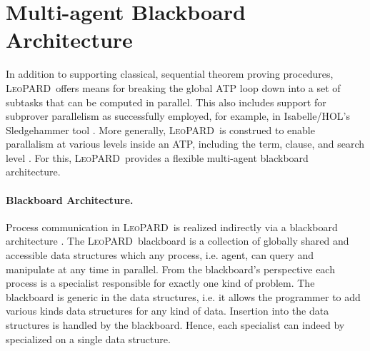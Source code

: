 \documentclass{llncs}
\def\sys{\mbox{\textsc{LeoPARD}}}
\begin{document}



\section{Multi-agent Blackboard Architecture}
In addition to supporting classical, sequential theorem proving
procedures, \sys\ offers means for breaking the global ATP
loop down into a set of subtasks that can be computed in
parallel. This also includes support for subprover parallelism as successfully
employed, for example, in Isabelle/HOL's Sledgehammer tool
\cite{Sledgehammer}. More generally, \sys\ is construed to enable
parallalism at various levels inside an ATP, including the term,
clause, and search level \cite{Bonacina01}. For this,  \sys\ provides a
flexible multi-agent blackboard architecture. 







\paragraph{Blackboard Architecture.} %
Process communication in \sys\ is realized indirectly via a blackboard
architecture \cite{weiss:mas}. The \sys\ blackboard
\cite{WisniewskiMSc} is a collection of globally shared and accessible
data structures which any process, i.e. agent, can query and
manipulate at any time in parallel.  From the blackboard's perspective each process is
a specialist responsible for exactly one kind of problem. The blackboard is generic in the data structures, i.e. 
it allows the programmer to add various kinds data structures for any kind of data.
Insertion into the data structures is handled by the blackboard. Hence, each specialist can indeed by
specialized on a single data structure.
\end{document}
